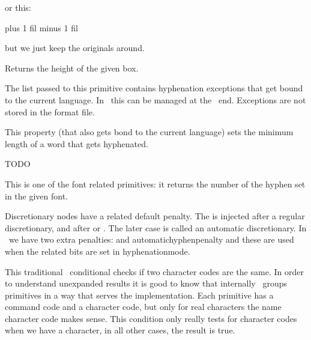 or this:

\starttyping
\gluespecdef\hssglue 0pt plus 1 fil minus 1 fil

\permanent\protected\untraced\def\hss
  {\hskip\hssglue}
\stoptyping

but we just keep the originals around.

\stopoldprimitive

\startoldprimitive[title={\prm {ht}}]

Returns the height of the given box.

\stopoldprimitive

\startoldprimitive[title={\prm {hyphenation}}]

The list passed to this primitive contains hyphenation exceptions that get bound
to the current language. In \LUAMETATEX\ this can be managed at the \LUA\ end.
Exceptions are not stored in the format file.

\stopoldprimitive

\startnewprimitive[title={\prm {hyphenationmin}}]

This property (that also gets bond to the current language) sets the minimum
length of a word that gets hyphenated.

\stopnewprimitive

\startnewprimitive[title={\prm {hyphenationmode}}]
    TODO
\stopnewprimitive

\startoldprimitive[title={\prm {hyphenchar}}]

This is one of the font related primitives: it returns the number of the hyphen
set in the given font.

\stopoldprimitive

\startoldprimitive[title={\prm {hyphenpenalty}}]

Discretionary nodes have a related default penalty. The  is
injected after a regular discretionary, and  after \type
{\-} or \type {-}. The later case is called an automatic discretionary. In
\LUAMETATEX\ we have two extra penalties:  and \prm
{automatichyphenpenalty} and these are used when the related bits are set in \prm
{hyphenationmode}.

\stopoldprimitive

\startoldprimitive[title={\prm {if}}]

This traditional \TEX\ conditional checks if two character codes are the same. In
order to understand unexpanded results it is good to know that internally \TEX\
groups primitives in a way that serves the implementation. Each primitive has a
command code and a character code, but only for real characters the name
character code makes sense. This condition only really tests for character codes
when we have a character, in all other cases, the result is true.

